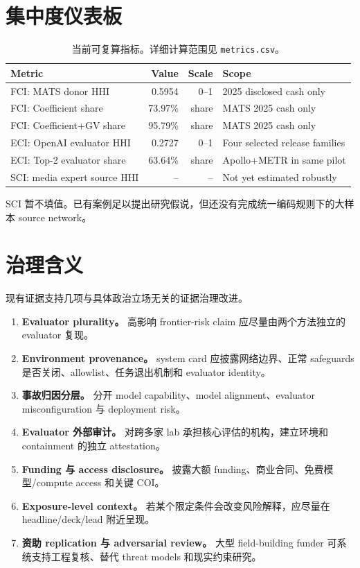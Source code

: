 \documentclass[11pt,twoside]{article}
\begin{document}
\section{集中度仪表板}
\begin{table}[ht]
\centering\small
\begin{tabularx}{\linewidth}{lrrX}
\toprule
Metric & Value & Scale & Scope \\
\midrule
FCI: MATS donor HHI & 0.5954 & 0--1 & 2025 disclosed cash only \\
FCI: Coefficient share & 73.97\% & share & MATS 2025 cash only \\
FCI: Coefficient+GV share & 95.79\% & share & MATS 2025 cash only \\
ECI: OpenAI evaluator HHI & 0.2727 & 0--1 & Four selected release families \\
ECI: Top-2 evaluator share & 63.64\% & share & Apollo+METR in same pilot \\
SCI: media expert source HHI & -- & -- & Not yet estimated robustly \\
\bottomrule
\end{tabularx}
\caption{当前可复算指标。详细计算范围见 \texttt{metrics.csv}。}
\end{table}

SCI 暂不填值。已有案例足以提出研究假说，但还没有完成统一编码规则下的大样本 source network。

\section{治理含义}
现有证据支持几项与具体政治立场无关的证据治理改进。
\begin{enumerate}
\item \textbf{Evaluator plurality。} 高影响 frontier-risk claim 应尽量由两个方法独立的 evaluator 复现。
\item \textbf{Environment provenance。} system card 应披露网络边界、正常 safeguards 是否关闭、allowlist、任务退出机制和 evaluator identity。
\item \textbf{事故归因分层。} 分开 model capability、model alignment、evaluator misconfiguration 与 deployment risk。
\item \textbf{Evaluator 外部审计。} 对跨多家 lab 承担核心评估的机构，建立环境和 containment 的独立 attestation。
\item \textbf{Funding 与 access disclosure。} 披露大额 funding、商业合同、免费模型/compute access 和关键 COI。
\item \textbf{Exposure-level context。} 若某个限定条件会改变风险解释，应尽量在 headline/deck/lead 附近呈现。
\item \textbf{资助 replication 与 adversarial review。} 大型 field-building funder 可系统支持工程复核、替代 threat models 和现实约束研究。
\end{enumerate}
\end{document}
